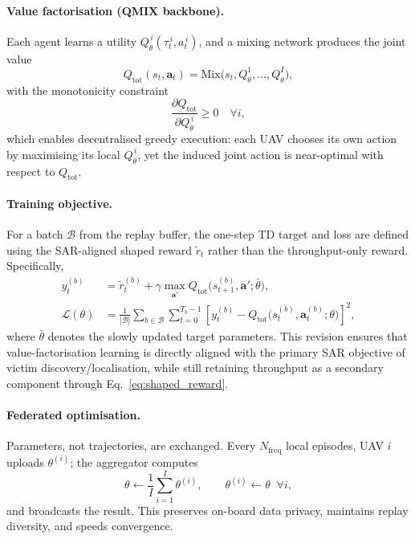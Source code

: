 \documentclass[drones,article,accept,pdftex,moreauthors]{Definitions/mdpi}
\begin{document}
\paragraph{Value factorisation (QMIX backbone).}
Each agent learns a utility $Q_\theta^{\,i}(\tau_t^{\,i},a_t^{\,i})$, and a mixing network
produces the joint value
\begin{equation}
Q_{\text{tot}}(s_t,\mathbf{a}_t)=\mathrm{Mix}\!\big(s_t, Q_\theta^{1},\dots,Q_\theta^{I}\big),
\label{eq:qtot}
\end{equation}
with the monotonicity constraint
\begin{equation}
\frac{\partial Q_{\text{tot}}}{\partial Q_\theta^{\,i}} \ge 0 \quad \forall i,
\label{eq:mono}
\end{equation}
which enables decentralised greedy execution: each UAV chooses its own action by
maximising its local $Q_\theta^{\,i}$, yet the induced joint action is near-optimal with
respect to $Q_{\text{tot}}$.

\paragraph{Training objective.}
For a batch $\mathcal{B}$ from the replay buffer, the one-step TD target and loss are
defined using the SAR-aligned shaped reward $\tilde r_t$ rather than the throughput-only
reward. Specifically,
\begin{subequations}\label{eq:td_all}
\begin{align}
y_t^{(b)} &= \tilde r_t^{(b)} + \gamma \max_{\mathbf{a}'}
Q_{\text{tot}}\!\big(s_{t+1}^{(b)}, \mathbf{a}'; \bar{\theta}\big),
\label{eq:td_target}\\
\mathcal{L}(\theta) &=
\frac{1}{|\mathcal{B}|}
\sum_{b\in\mathcal{B}}\sum_{t=0}^{T_b-1}
\!\left[
  y_t^{(b)} - Q_{\text{tot}}\!\big(s_t^{(b)}, \mathbf{a}_t^{(b)}; \theta\big)
\right]^2,
\label{eq:td_loss}
\end{align}
\end{subequations}
where $\bar{\theta}$ denotes the slowly updated target parameters. This revision ensures
that value-factorisation learning is directly aligned with the primary SAR objective of
victim discovery/localisation, while still retaining throughput as a secondary component
through Eq.~\eqref{eq:shaped_reward}.

\paragraph{Federated optimisation.}
Parameters, not trajectories, are exchanged. Every $N_{\text{freq}}$ local episodes, UAV
$i$ uploads $\theta^{(i)}$; the aggregator computes
\begin{equation}
\theta \leftarrow \frac{1}{I}\sum_{i=1}^{I} \theta^{(i)}, \qquad
\theta^{(i)} \leftarrow \theta \;\; \forall i ,
\label{eq:fedavg}
\end{equation}
and broadcasts the result. This preserves on-board data privacy, maintains replay
diversity, and speeds convergence.
\end{document}
